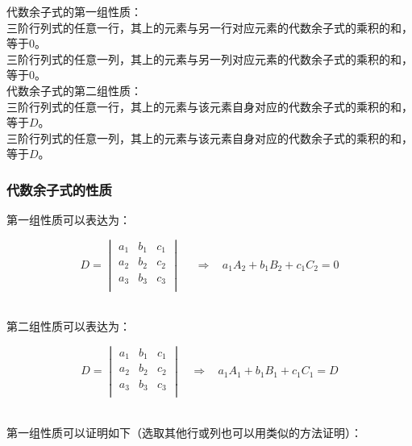 \documentclass[UTF8]{ctexart}
\begin{document}
    代数余子式的第一组性质：\\[3mm]
    三阶行列式的任意一行，其上的元素与另一行对应元素的代数余子式的乘积的和，等于$0$。\\[3mm]
    三阶行列式的任意一列，其上的元素与另一列对应元素的代数余子式的乘积的和，等于$0$。\\[5mm]
    代数余子式的第二组性质：\\[3mm]
    三阶行列式的任意一行，其上的元素与该元素自身对应的代数余子式的乘积的和，等于$D$。\\[3mm]
    三阶行列式的任意一列，其上的元素与该元素自身对应的代数余子式的乘积的和，等于$D$。

\newpage

\subsubsection{代数余子式的性质}
    第一组性质可以表达为：
    \begin{large}
        \begin{equation*}
            D=
            \begin{vmatrix}
                a_1&b_1&c_1\\
                a_2&b_2&c_2\\
                a_3&b_3&c_3\\
            \end{vmatrix}
            ~~~~~~\Longrightarrow~~~~
            a_1A_2+b_1B_2+c_1C_2=0
        \end{equation*}
    \end{large}\\[2mm]
    第二组性质可以表达为：
    \begin{large}
        \begin{equation*}
            D=
            \begin{vmatrix}
                a_1&b_1&c_1\\
                a_2&b_2&c_2\\
                a_3&b_3&c_3\\
            \end{vmatrix}
            ~~~~\Longrightarrow~~~~
            a_1A_1+b_1B_1+c_1C_1=D
        \end{equation*}
    \end{large}\\[2mm]
    第一组性质可以证明如下（选取其他行或列也可以用类似的方法证明）：\vspace{5pt}
    \setcounter{equation}{0}
\end{document}
